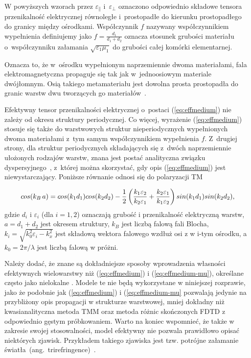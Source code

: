 W powyższych wzorach przez $\varepsilon_{\parallel}$ i~$\varepsilon_{\perp}$ oznaczono odpowiednio składowe tensora przenikalność elektrycznej równoległe i~prostopadłe do kierunku prostopadłego do granicy między ośrodkami. Współczynnik $f$ nazywany współczynnikiem wypełnienia definiujemy jako $f=\frac{d_1}{d_1+d_2}$ oznacza stosunek grubości materiału o~współczynniku załamania $\sqrt{\varepsilon_1 \mu_1}$ do grubości całej komórki elementarnej.

Oznacza to, że w~ośrodku wypełnionym naprzemiennie dwoma materiałami, fala elektromagnetyczna propaguje się tak jak w~jednoosiowym materiale dwójłomnym. Osią takiego metamateriału jest dowolna prosta prostopadła do granic warstw dwu tworzących go materiałów~\cite{sihvola1999electromagnetic}.

Efektywny tensor przenikalności elektrycznej o~postaci (\ref{eq:effmedium}) nie zależy od okresu struktury periodycznej. Co więcej, wyrażenie (\ref{eq:effmedium}) stosuje się  także do warstwowych struktur nieperiodycznych wypełnionych dwoma materiałami z~tym samym współczynnikiem wypełnienia $f$. Z~drugiej strony, dla struktur periodycznych składających się z~dwóch naprzemiennie ułożonych rodzajów warstw, znana jest postać analityczna związku dyspersyjnego~\cite{pastuszczak2011optimized}, z~której można skorzystać, gdy opis (\ref{eq:effmedium}) jest niewystarczający. Poniższe równanie odnosi się do polaryzacji TM

\begin{equation}
cos(k_{B} \,a) = cos(k_{1} d_1) cos(k_{2} d_2) \\
- \frac{1}{2} \left(\frac{k_{1} \varepsilon_2}{k_{2} \varepsilon_1} + \frac{k_{2} \varepsilon_1}{k_{1} \varepsilon_2}\right)
sin(k_{1} d_1) sin(k_{2} d_2),
\label{eq_dispersion}
\end{equation}
gdzie $d_i$ i $\varepsilon_i$ (dla $i=1,2$) oznaczają grubość i przenikalność elektryczną warstw, $a=d_1+d_2$ jest okresem struktury, $k_B$ jest liczbą falową fali Blocha, $k_i = \sqrt{k_0^2 \varepsilon_i-k_{x}^2}$ jest składową wektora falowego wzdłuż osi z w i-tym ośrodku, a $k_0=2\pi/\lambda$ jest liczbą falową w próżni. 

Należy dodać, że znane są dokładniejsze sposoby wprowadzenia własności efektywnych wielowarstwy niż (\ref{eq:effmedium}) i (\ref{eq:effmedium-mu}), określane często jako nielokalne \cite{elser2007nonlocal,chebykin2011nonlocal}. Modele te nie będą wykorzystane w niniejszej rozprawie, jako że podobnie jak (\ref{eq:effmedium}) i (\ref{eq:effmedium-mu} pozwalają jedynie na przybliżony opis propagacji w strukturze warstwowej, mniej dokładny niż kwasianalityczna metoda TMM oraz metoda różnic skończonych FDTD z odpowiednio gęstym próbkowaniem. Warto na koniec wspomnieć, że także w zakresie swojej stosowalności, model efektywny nie pozwala prawidłowo opisać niektórych zjawisk. Przykładem takiego zjawiska jest tzw. potrójne załamanie światła~(ang.~trirefringence)~\cite{netti2001optical,diaz2016some}.
